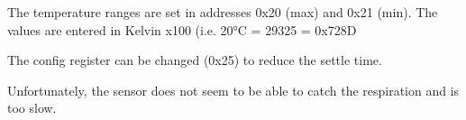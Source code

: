 \documentclass[a4paper]{article}
\begin{document}
The temperature ranges are set in addresses 0x20 (max) and 0x21 (min). The values are entered in Kelvin x100 (i.e. 20°C = 29325 = 0x728D

The config register can be changed (0x25) to reduce the settle time.

Unfortunately, the sensor does not seem to be able to catch the respiration and is too slow.








\end{document}
